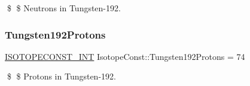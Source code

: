 \$ \$ Neutrons in Tungsten-\/192. \mbox{\label{group___isotope_const-_tungsten-_w192_ga1cf2243a04d4a21adc771ee75d7c43d6}} 
\subsubsection{\texorpdfstring{Tungsten192\+Protons}{Tungsten192Protons}}
{\footnotesize\ttfamily \mbox{\hyperlink{group___isotope_const-_macros_ga5f18360b3e99483a35c32d789e62621c}{I\+S\+O\+T\+O\+P\+E\+C\+O\+N\+S\+T\+\_\+\+I\+NT}} Isotope\+Const\+::\+Tungsten192\+Protons = 74}

\$ \$ Protons in Tungsten-\/192. 